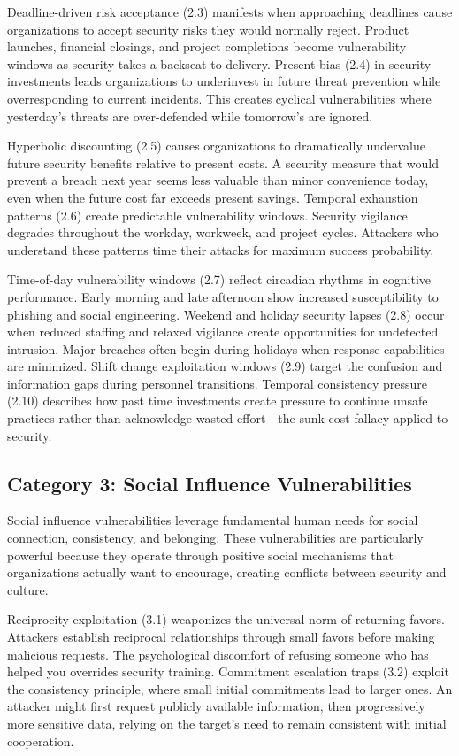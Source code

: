 \documentclass[11pt,a4paper]{article}
\begin{document}
Deadline-driven risk acceptance (2.3) manifests when approaching deadlines cause organizations to accept security risks they would normally reject. Product launches, financial closings, and project completions become vulnerability windows as security takes a backseat to delivery. Present bias (2.4) in security investments leads organizations to underinvest in future threat prevention while overresponding to current incidents. This creates cyclical vulnerabilities where yesterday's threats are over-defended while tomorrow's are ignored.

Hyperbolic discounting (2.5) causes organizations to dramatically undervalue future security benefits relative to present costs. A security measure that would prevent a breach next year seems less valuable than minor convenience today, even when the future cost far exceeds present savings. Temporal exhaustion patterns (2.6) create predictable vulnerability windows. Security vigilance degrades throughout the workday, workweek, and project cycles. Attackers who understand these patterns time their attacks for maximum success probability.

Time-of-day vulnerability windows (2.7) reflect circadian rhythms in cognitive performance. Early morning and late afternoon show increased susceptibility to phishing and social engineering. Weekend and holiday security lapses (2.8) occur when reduced staffing and relaxed vigilance create opportunities for undetected intrusion. Major breaches often begin during holidays when response capabilities are minimized. Shift change exploitation windows (2.9) target the confusion and information gaps during personnel transitions. Temporal consistency pressure (2.10) describes how past time investments create pressure to continue unsafe practices rather than acknowledge wasted effort—the sunk cost fallacy applied to security.

\subsection{Category 3: Social Influence Vulnerabilities}

Social influence vulnerabilities leverage fundamental human needs for social connection, consistency, and belonging. These vulnerabilities are particularly powerful because they operate through positive social mechanisms that organizations actually want to encourage, creating conflicts between security and culture.

Reciprocity exploitation (3.1) weaponizes the universal norm of returning favors. Attackers establish reciprocal relationships through small favors before making malicious requests. The psychological discomfort of refusing someone who has helped you overrides security training. Commitment escalation traps (3.2) exploit the consistency principle, where small initial commitments lead to larger ones. An attacker might first request publicly available information, then progressively more sensitive data, relying on the target's need to remain consistent with initial cooperation.
\end{document}
